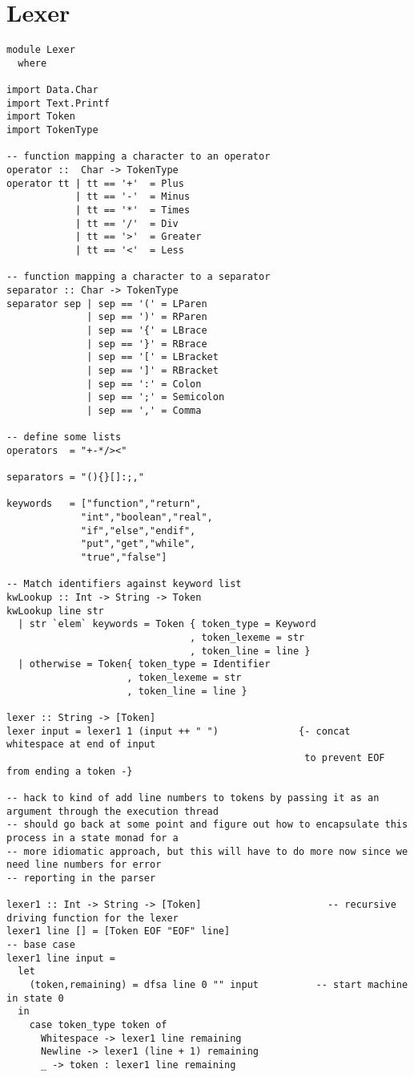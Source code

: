 \documentclass[11pt]{article}
\begin{document}
\section*{Lexer}
\label{sec-3}
\begin{verbatim}
module Lexer
  where

import Data.Char
import Text.Printf
import Token
import TokenType

-- function mapping a character to an operator
operator ::  Char -> TokenType
operator tt | tt == '+'  = Plus
            | tt == '-'  = Minus
            | tt == '*'  = Times
            | tt == '/'  = Div
            | tt == '>'  = Greater
            | tt == '<'  = Less

-- function mapping a character to a separator
separator :: Char -> TokenType
separator sep | sep == '(' = LParen
              | sep == ')' = RParen
              | sep == '{' = LBrace
              | sep == '}' = RBrace
              | sep == '[' = LBracket
              | sep == ']' = RBracket
              | sep == ':' = Colon
              | sep == ';' = Semicolon
              | sep == ',' = Comma

-- define some lists
operators  = "+-*/><"

separators = "(){}[]:;,"

keywords   = ["function","return",
             "int","boolean","real",
             "if","else","endif",
             "put","get","while",
             "true","false"]

-- Match identifiers against keyword list
kwLookup :: Int -> String -> Token
kwLookup line str
  | str `elem` keywords = Token { token_type = Keyword
                                , token_lexeme = str
                                , token_line = line }
  | otherwise = Token{ token_type = Identifier
                     , token_lexeme = str
                     , token_line = line }

lexer :: String -> [Token]
lexer input = lexer1 1 (input ++ " ")              {- concat whitespace at end of input
                                                    to prevent EOF from ending a token -}

-- hack to kind of add line numbers to tokens by passing it as an argument through the execution thread
-- should go back at some point and figure out how to encapsulate this process in a state monad for a
-- more idiomatic approach, but this will have to do more now since we need line numbers for error
-- reporting in the parser

lexer1 :: Int -> String -> [Token]                      -- recursive driving function for the lexer
lexer1 line [] = [Token EOF "EOF" line]                                  -- base case
lexer1 line input =
  let
    (token,remaining) = dfsa line 0 "" input          -- start machine in state 0
  in
    case token_type token of
      Whitespace -> lexer1 line remaining
      Newline -> lexer1 (line + 1) remaining
      _ -> token : lexer1 line remaining


\end{verbatim}
\end{document}
